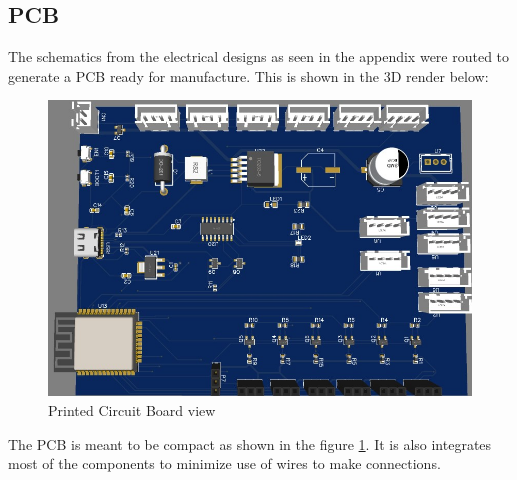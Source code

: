 \subsection{PCB}
The schematics from the electrical designs as seen in the appendix were routed to generate a PCB ready for manufacture. This is shown in the 3D render below:
\begin{center}
	\begin{figure}[H]
		\centering
		\includegraphics[width=0.7\linewidth]{Figures/pcb}
		\caption[Printed Circuit Board view]{Printed Circuit Board view}
		\label{fig:pcb3d}
	\end{figure}
\end{center}
The PCB is meant to be compact as shown in the figure \ref{fig:pcb3d}. It is also integrates most of the components to minimize use of wires to make connections.

